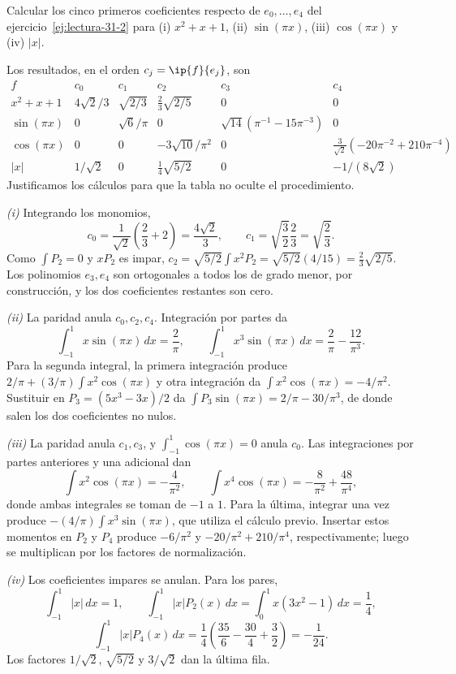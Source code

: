 \begin{ejercicio}\label{ej:lectura-31-6}
Calcular los cinco primeros coeficientes respecto de $e_0,\dots,e_4$ del ejercicio~\ref{ej:lectura-31-2} para (i) $x^2+x+1$, (ii) $\sin(\pi x)$, (iii) $\cos(\pi x)$ y (iv) $|x|$.
\end{ejercicio}
\begin{solucion}
Los resultados, en el orden $c_j=\ip{f}{e_j}$, son
\[
\begin{array}{c|ccccc}
 f&c_0&c_1&c_2&c_3&c_4\\ \hline
 x^2+x+1&4\sqrt2/3&\sqrt{2/3}&\frac23\sqrt{2/5}&0&0\\[2pt]
 \sin(\pi x)&0&\sqrt6/\pi&0&\sqrt{14}(\pi^{-1}-15\pi^{-3})&0\\[2pt]
 \cos(\pi x)&0&0&-3\sqrt{10}/\pi^2&0&\frac3{\sqrt2}(-20\pi^{-2}+210\pi^{-4})\\[2pt]
 |x|&1/\sqrt2&0&\frac14\sqrt{5/2}&0&-1/(8\sqrt2)
\end{array}
\]
Justificamos los cálculos para que la tabla no oculte el procedimiento.

\emph{(i)} Integrando los monomios,
\[
 c_0=\frac1{\sqrt2}\left(\frac23+2\right)=\frac{4\sqrt2}3,
 \qquad c_1=\sqrt{\frac32}\frac23=\sqrt{\frac23}.
\]
Como $\int P_2=0$ y $xP_2$ es impar,
$c_2=\sqrt{5/2}\int x^2P_2=\sqrt{5/2}(4/15)=\frac23\sqrt{2/5}$.
Los polinomios $e_3,e_4$ son ortogonales a todos los de grado menor, por construcción, y los dos coeficientes restantes son cero.

\emph{(ii)} La paridad anula $c_0,c_2,c_4$. Integración por partes da
\[
 \int_{-1}^{1}x\sin(\pi x)\,dx=\frac2\pi,
 \qquad
 \int_{-1}^{1}x^3\sin(\pi x)\,dx=\frac2\pi-\frac{12}{\pi^3}.
\]
Para la segunda integral, la primera integración produce $2/\pi+(3/\pi)\int x^2\cos(\pi x)$ y otra integración da $\int x^2\cos(\pi x)=-4/\pi^2$. Sustituir en $P_3=(5x^3-3x)/2$ da $\int P_3\sin(\pi x)=2/\pi-30/\pi^3$, de donde salen los dos coeficientes no nulos.

\emph{(iii)} La paridad anula $c_1,c_3$, y $\int_{-1}^{1}\cos(\pi x)=0$ anula $c_0$. Las integraciones por partes anteriores y una adicional dan
\[
 \int x^2\cos(\pi x)=-\frac4{\pi^2},\qquad
 \int x^4\cos(\pi x)=-\frac8{\pi^2}+\frac{48}{\pi^4},
\]
donde ambas integrales se toman de $-1$ a $1$. Para la última, integrar una vez produce $-(4/\pi)\int x^3\sin(\pi x)$, que utiliza el cálculo previo. Insertar estos momentos en $P_2$ y $P_4$ produce $-6/\pi^2$ y $-20/\pi^2+210/\pi^4$, respectivamente; luego se multiplican por los factores de normalización.

\emph{(iv)} Los coeficientes impares se anulan. Para los pares,
\[
 \int_{-1}^{1}|x|\,dx=1,\qquad
 \int_{-1}^{1}|x|P_2(x)\,dx=\int_0^1x(3x^2-1)\,dx=\frac14,
\]
\[
 \int_{-1}^{1}|x|P_4(x)\,dx
 =\frac14\left(\frac{35}{6}-\frac{30}{4}+\frac32\right)=-\frac1{24}.
\]
Los factores $1/\sqrt2$, $\sqrt{5/2}$ y $3/\sqrt2$ dan la última fila.
\end{solucion}

